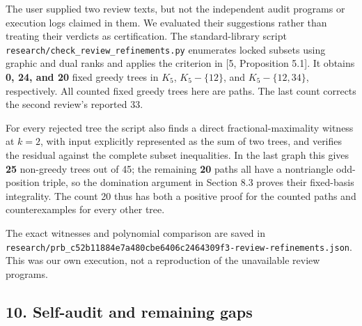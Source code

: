 \documentclass{article}
\begin{document}
The user supplied two review texts, but not the independent audit programs or execution logs claimed in them. We evaluated their suggestions rather than treating their verdicts as certification. The standard-library script \texttt{research/check\_review\_refinements.py} enumerates locked subsets using graphic and dual ranks and applies the criterion in [5, Proposition 5.1]. It obtains \textbf{0, 24, and 20} fixed greedy trees in \(K_5\), \(K_5-\{12\}\), and \(K_5-\{12,34\}\), respectively. All counted fixed greedy trees here are paths. The last count corrects the second review's reported 33.

For every rejected tree the script also finds a direct fractional-maximality witness at \(k=2\), with input explicitly represented as the sum of two trees, and verifies the residual against the complete subset inequalities. In the last graph this gives \textbf{25} non-greedy trees out of 45; the remaining \textbf{20} paths all have a nontriangle odd-position triple, so the domination argument in Section 8.3 proves their fixed-basis integrality. The count 20 thus has both a positive proof for the counted paths and counterexamples for every other tree.

The exact witnesses and polynomial comparison are saved in \texttt{research/prb_c52b11884e7a480cbe6406c2464309f3-review-refinements.json}. This was our own execution, not a reproduction of the unavailable review programs.

\subsection{10. Self-audit and remaining gaps}
\end{document}
